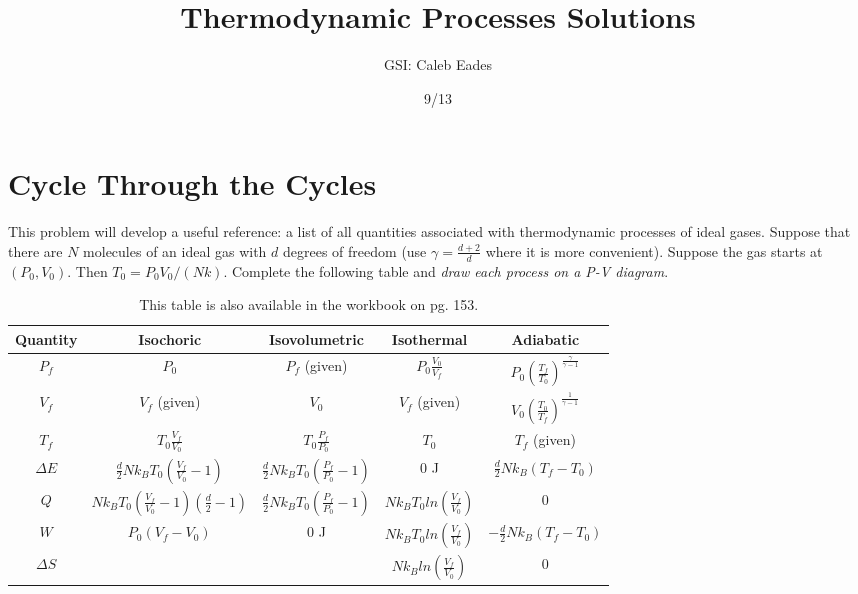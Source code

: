 \documentclass{article}
\begin{document}
\title{Thermodynamic Processes Solutions}
\author{GSI: Caleb Eades}
\date{9/13}
\maketitle

\section{Cycle Through the Cycles}

This problem will develop a useful reference: a list of all quantities associated with thermodynamic processes of ideal gases. Suppose that there are $N$ molecules of an ideal gas with $d$ degrees of freedom (use $\gamma = \frac{d+2}{d}$ where it is more convenient). Suppose the gas starts at $(P_0,V_0)$. Then $T_0 = P_0V_0/(Nk)$. Complete the following table and \textit{draw each process on a P-V diagram}.

\def\arraystretch{2.5}
\begin{table}[h]
	\begin{center}
	\caption{This table is also available in the workbook on pg. 153.}
	
	\begin{tabular}{| >{\Large}c|c|c|c|c|}
		\hline
		\normalsize{\textbf{Quantity}} & \textbf{Isochoric} & \textbf{Isovolumetric} & \textbf{Isothermal} & \textbf{Adiabatic} \\ \hline
		$P_f$             & $P_0$             & $P_f$ (given)          & $P_0\frac{V_0}{V_f}$& $P_0\left(\frac{T_f}{T_0}\right)^{\frac{\gamma}{\gamma-1}}$                   \\ \hline
		$V_f$             & $V_f$ (given)     & $V_0$                  & $V_f$ (given)       & $V_0\left(\frac{T_0}{T_f}\right)^{\frac{1}{\gamma-1}}$                   \\ \hline
		$T_f$             & $T_0\frac{V_f}{V_0}$& $T_0\frac{P_f}{P_0}$ & $T_0$               & $T_f$ (given)      \\ \hline
		$\Delta E$        & $\frac{d}{2}Nk_BT_0\left(\frac{V_f}{V_0}-1\right)$ & $\frac{d}{2}Nk_BT_0\left(\frac{P_f}{P_0}-1\right)$                       & $0$ J                 & $\frac{d}{2}Nk_B(T_f-T_0)$                   \\ \hline
		$Q$               & $Nk_BT_0\left(\frac{V_f}{V_0}-1\right)\left(\frac{d}{2}-1\right)$                  & $\frac{d}{2}Nk_BT_0\left(\frac{P_f}{P_0}-1\right)$                       & $Nk_BT_0ln\left(\frac{V_f}{V_0}\right)$                    & $0$                   \\ \hline
		$W$               & $P_0(V_f-V_0)$                  & $0$ J                      & $Nk_BT_0ln\left(\frac{V_f}{V_0}\right)$                    & $-\frac{d}{2}Nk_B(T_f-T_0)$                   \\ \hline
		$\Delta S$        &                   &                        & $Nk_Bln\left(\frac{V_f}{V_0}\right)$                    & $0$                    \\ \hline
	\end{tabular}
	\end{center}
\end{table}
\end{document}
